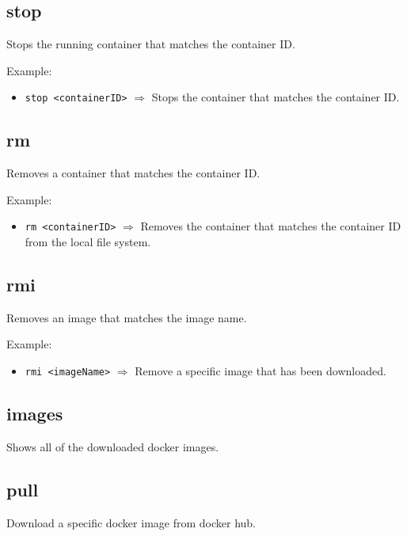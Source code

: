 \documentclass[a4paper, 12pt]{article}
\begin{document}
\subsection{stop}

Stops the running container that matches the container ID.

\vspace{0.5em}
Example:
\begin{itemize}
	\item \texttt{stop <containerID>} $\Rightarrow$ Stops the container that
	matches the container ID.
\end{itemize}

\subsection{rm}

Removes a container that matches the container ID.

\vspace{0.5em}
Example:
\begin{itemize}
	\item \texttt{rm <containerID>} $\Rightarrow$ Removes the container that
	matches the container ID from the local file system.
\end{itemize}

\subsection{rmi}

Removes an image that matches the image name.

\vspace{0.5em}
Example:
\begin{itemize}
	\item \texttt{rmi <imageName>} $\Rightarrow$ Remove a specific image that
	has been downloaded.
\end{itemize}

\subsection{images}

Shows all of the downloaded docker images.

\subsection{pull}

Download a specific docker image from docker hub.
\end{document}
